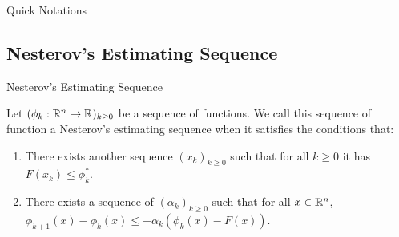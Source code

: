 \documentclass[11pt]{beamer}
\begin{document}
        \begin{frame}{Quick Notations}
            
        \end{frame}
    \subsection{Nesterov's Estimating Sequence}
        \begin{frame}{Nesterov's Estimating Sequence}            
            \begin{definition}\label{def:nes-est-seq}
                Let $(\phi_k : \mathbb R^n \mapsto \mathbb R)_{k \ge 0}$ be a sequence of functions. 
                We call this sequence of function a Nesterov's estimating sequence when it satisfies the conditions that: 
                \begin{enumerate}
                    \item There exists another sequence $(x_k)_{k \ge 0}$ such that for all $k \ge 0$ it has $F(x_k) \le \phi_k^*$. 
                    \item There exists a sequence of $(\alpha_k)_{k \ge 0}$ such that for all $x \in \mathbb R^n$, $\phi_{k + 1}(x) - \phi_k(x) \le - \alpha_k(\phi_k(x) - F(x))$. 
                \end{enumerate}
            \end{definition}
        \end{frame}
\end{document}
